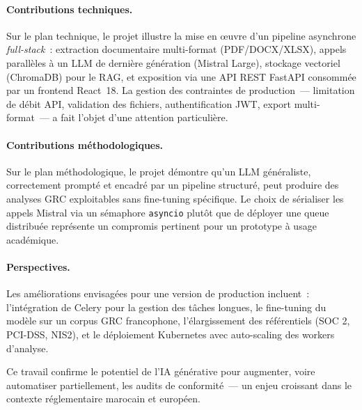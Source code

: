 \documentclass[a4paper,12pt,oneside]{report}
\begin{document}
	\paragraph{Contributions techniques.}
	Sur le plan technique, le projet illustre la mise en \oe{}uvre d'un pipeline asynchrone \textit{full-stack}~: extraction documentaire multi-format (PDF/DOCX/XLSX), appels parall\`eles \`a un LLM de derni\`ere g\'en\'eration (Mistral Large), stockage vectoriel (ChromaDB) pour le RAG, et exposition via une API REST FastAPI consomm\'ee par un frontend React~18. La gestion des contraintes de production~--- limitation de d\'ebit API, validation des fichiers, authentification JWT, export multi-format~--- a fait l'objet d'une attention particuli\`ere.
	
	\paragraph{Contributions m\'ethodologiques.}
	Sur le plan m\'ethodologique, le projet d\'emontre qu'un LLM g\'en\'eraliste, correctement prompt\'e et encadr\'e par un pipeline structur\'e, peut produire des analyses GRC exploitables sans fine-tuning sp\'ecifique. Le choix de s\'erialiser les appels Mistral via un s\'emaphore \texttt{asyncio} plut\^ot que de d\'eployer une queue distribu\'ee repr\'esente un compromis pertinent pour un prototype \`a usage acad\'emique.
	
	\paragraph{Perspectives.}
	Les am\'eliorations envisag\'ees pour une version de production incluent~: l'int\'egration de Celery pour la gestion des t\^aches longues, le fine-tuning du mod\`ele sur un corpus GRC francophone, l'\'elargissement des r\'ef\'erentiels (SOC 2, PCI-DSS, NIS2), et le d\'eploiement Kubernetes avec auto-scaling des workers d'analyse.
	
	Ce travail confirme le potentiel de l'IA g\'en\'erative pour augmenter, voire automatiser partiellement, les audits de conformit\'e~--- un enjeu croissant dans le contexte r\'eglementaire marocain et europ\'een.
	
\end{document}
